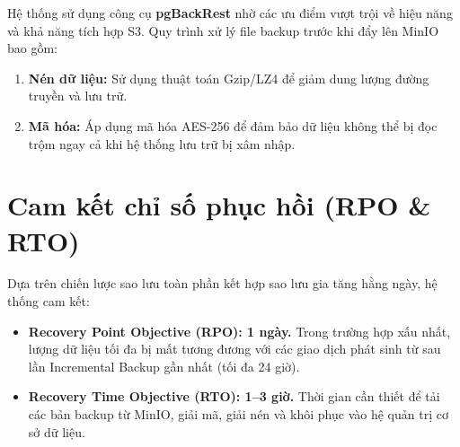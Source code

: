 Hệ thống sử dụng công cụ \textbf{pgBackRest} nhờ các ưu điểm vượt trội về hiệu năng và khả năng tích hợp S3. Quy trình xử lý file backup trước khi đẩy lên MinIO bao gồm:
\begin{enumerate}
    \item \textbf{Nén dữ liệu:} Sử dụng thuật toán Gzip/LZ4 để giảm dung lượng đường truyền và lưu trữ.
    \item \textbf{Mã hóa:} Áp dụng mã hóa AES-256 để đảm bảo dữ liệu không thể bị đọc trộm ngay cả khi hệ thống lưu trữ bị xâm nhập.
\end{enumerate}

\section{Cam kết chỉ số phục hồi (RPO \& RTO)}

Dựa trên chiến lược sao lưu toàn phần kết hợp sao lưu gia tăng hằng ngày, hệ thống cam kết:

\begin{itemize}
    \item \textbf{Recovery Point Objective (RPO): 1 ngày.}
    Trong trường hợp xấu nhất, lượng dữ liệu tối đa bị mất tương đương với các giao dịch phát sinh từ sau lần Incremental Backup gần nhất (tối đa 24 giờ).
    
    \item \textbf{Recovery Time Objective (RTO): 1–3 giờ.}
    Thời gian cần thiết để tải các bản backup từ MinIO, giải mã, giải nén và khôi phục vào hệ quản trị cơ sở dữ liệu.
\end{itemize}